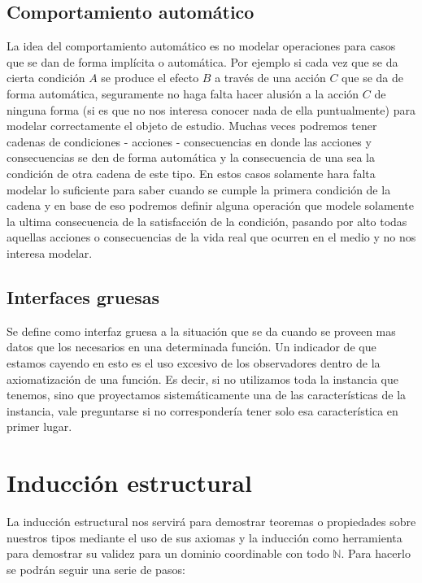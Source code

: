 \subsection*{Comportamiento autom\'atico}

La idea del comportamiento autom\'atico es no modelar operaciones para casos que se dan de forma impl\'icita o autom\'atica. Por ejemplo si cada vez que se da cierta condici\'on $A$ se produce el efecto $B$ a trav\'es de una acci\'on $C$ que se da de forma autom\'atica, seguramente no haga falta hacer alusi\'on a la acci\'on $C$ de ninguna forma (si es que no nos interesa conocer nada de ella puntualmente) para modelar correctamente el objeto de estudio. Muchas veces podremos tener cadenas de condiciones - acciones - consecuencias en donde las acciones y consecuencias se den de forma autom\'atica y la consecuencia de una sea la condici\'on de otra cadena de este tipo. En estos casos solamente hara falta modelar lo suficiente para saber cuando se cumple la primera condici\'on de la cadena y en base de eso podremos definir alguna operaci\'on que modele solamente la ultima consecuencia de la satisfacci\'on de la condici\'on, pasando por alto todas aquellas acciones o consecuencias de la vida real que ocurren en
el medio y no nos interesa modelar.

\subsection{Interfaces gruesas}

Se define como interfaz gruesa a la situaci\'on que se da cuando se proveen mas datos que los necesarios en una determinada funci\'on. Un indicador de que estamos cayendo en esto es el uso excesivo de los observadores dentro de la axiomatizaci\'on de una funci\'on. Es decir, si no utilizamos toda la instancia que tenemos, sino que proyectamos sistem\'aticamente una de las caracter\'isticas de la instancia, vale preguntarse si no corresponder\'ia tener solo esa caracter\'istica en primer lugar.

\newpage
\section{Inducci\'on estructural}

La inducci\'on estructural nos servir\'a para demostrar teoremas o propiedades sobre nuestros tipos mediante el uso de sus axiomas y la inducci\'on como herramienta para demostrar su validez para un dominio coordinable con todo $\mathbb{N}$. Para hacerlo se podr\'an seguir una serie de pasos:

